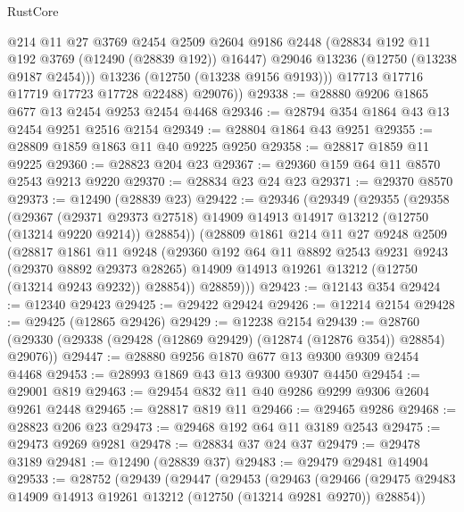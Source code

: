 \begin{lexlean}{RustCore}
\begin{coremodule}
              @214
              @11
              @27
              @3769
              @2454
              @2509
              @2604
              @9186
              @2448
              (@28834 @192 @11 @192 @3769 (@12490 (@28839 @192)) @16447)
              @29046
              @13236
              (@12750 (@13238 @9187 @2454)))
            @13236
            (@12750 (@13238 @9156 @9193)))
          @17713
          @17716
          @17719
          @17723
          @17728
          @22488)
        @29076))
@29338 := @28880 @9206 @1865 @677 @13 @2454 @9253 @2454 @4468
@29346 := @28794 @354 @1864 @43 @13 @2454 @9251 @2516 @2154
@29349 := @28804 @1864 @43 @9251
@29355 := @28809 @1859 @1863 @11 @40 @9225 @9250
@29358 := @28817 @1859 @11 @9225
@29360 := @28823 @204 @23
@29367 := @29360 @159 @64 @11 @8570 @2543 @9213 @9220
@29370 := @28834 @23 @24 @23
@29371 := @29370 @8570
@29373 := @12490 (@28839 @23)
@29422 := @29346
    (@29349
      (@29355
        (@29358
          (@29367
            (@29371 @29373 @27518)
            @14909
            @14913
            @14917
            @13212
            (@12750 (@13214 @9220 @9214))
            @28854))
        (@28809
          @1861
          @214
          @11
          @27
          @9248
          @2509
          (@28817
            @1861
            @11
            @9248
            (@29360
              @192
              @64
              @11
              @8892
              @2543
              @9231
              @9243
              (@29370 @8892 @29373 @28265)
              @14909
              @14913
              @19261
              @13212
              (@12750 (@13214 @9243 @9232))
              @28854))
          @28859)))
@29423 := @12143 @354
@29424 := @12340 @29423
@29425 := @29422 @29424
@29426 := @12214 @2154
@29428 := @29425 (@12865 @29426)
@29429 := @12238 @2154
@29439 := @28760 (@29330 (@29338 (@29428 (@12869 @29429) (@12874 (@12876 @354)) @28854) @29076))
@29447 := @28880 @9256 @1870 @677 @13 @9300 @9309 @2454 @4468
@29453 := @28993 @1869 @43 @13 @9300 @9307 @4450
@29454 := @29001 @819
@29463 := @29454 @832 @11 @40 @9286 @9299 @9306 @2604 @9261 @2448
@29465 := @28817 @819 @11
@29466 := @29465 @9286
@29468 := @28823 @206 @23
@29473 := @29468 @192 @64 @11 @3189 @2543
@29475 := @29473 @9269 @9281
@29478 := @28834 @37 @24 @37
@29479 := @29478 @3189
@29481 := @12490 (@28839 @37)
@29483 := @29479 @29481 @14904
@29533 := @28752
    (@29439
      (@29447
        (@29453
          (@29463
            (@29466
              (@29475 @29483 @14909 @14913 @19261 @13212 (@12750 (@13214 @9281 @9270)) @28854))

\end{coremodule}
\end{lexlean}

